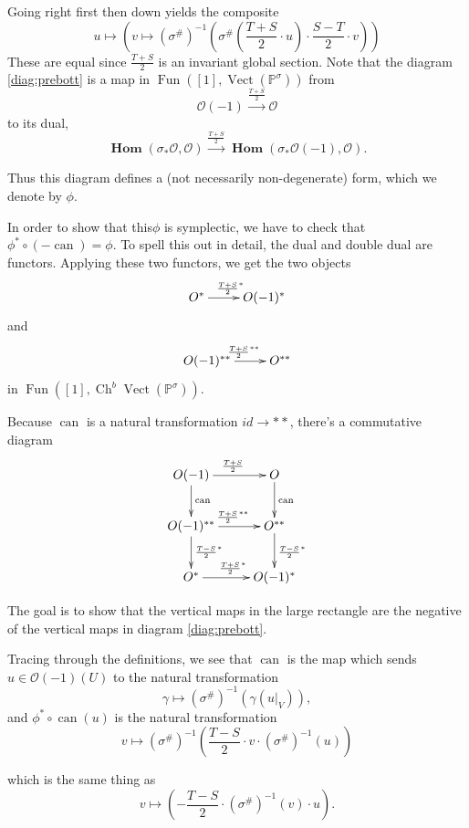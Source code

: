 \documentclass[draftthesis,tocnosub,noragright,centerchapter,10pt]{uiucthesis2009}
\newcommand{\mbb}{\mathbb}
\newcommand{\mc}{\mathcal}
\DeclareMathOperator{\can}{can}
\DeclareMathOperator{\iHom}{\mathbf{Hom}}
\DeclareMathOperator{\Ch}{Ch}
\DeclareMathOperator{\Fun}{Fun}
\DeclareMathOperator{\Vect}{Vect}
\theoremstyle{plain}
\theoremstyle{definition}
\begin{document}
Going right first then down yields the composite
\[
u \mapsto (v \mapsto (\sigma^\#)^{-1}(\sigma^\#(\frac{T+S}{2} \cdot u
)\cdot \frac{S-T}{2}\cdot v))
\]
These are equal since $\frac{T+S}{2}$ is an invariant global
section. Note that the diagram \ref{diag:prebott} is a map in
$\Fun([1],\Vect(\mbb P^\sigma))$ from 
\[
\mc O(-1) \xrightarrow{\frac{T+S}{2}} \mc O
\]
to its dual,
\[
\iHom(\sigma_*\mc
  O,\mc O) \xrightarrow{\frac{T+S}{2}}  \iHom(\sigma_* \mc O(-1),\mc O).
\]

Thus this diagram defines a (not necessarily non-degenerate) form,
which we denote by $\phi$. 

In order to show that this$\phi$ is symplectic, we have to check that
$\phi^* \circ (-\can) = \phi$. To spell this out in detail, the dual
and double dual are functors. Applying these two functors, we get the
two objects
\[
\xymatrix{O^* \ar[r]^{\frac{T+S}{2}^\ast} & O(-1)^*}
\]
and
\[
\xymatrix{O(-1)^{\ast\ast} \ar[r]^{\frac{T+S}{2}^{\ast\ast}} & O^{\ast\ast}}
\]
in  $\Fun([1],\Ch^b\Vect(\mbb P^\sigma))$.

Because $\can$ is a natural transformation $id \rightarrow \ast\ast$,
there's a commutative diagram
\[
\xymatrix{O(-1) \ar[d]^{\can} \ar[r]^{\frac{T+S}{2}} & O \ar[d]^{\can}
  \\ O(-1)^{\ast\ast} \ar[r]^{\frac{T+S}{2}^{\ast\ast}}
  \ar[d]^{\frac{T-S}{2}^\ast} & \ar[d]^{\frac{T-S}{2}^\ast}  O^{\ast\ast}
\\O^{\ast} \ar[r]^{\frac{T+S}{2}^{\ast}} & O(-1)^{\ast}
}
\]

The goal is to show that the vertical maps in the large rectangle are
the negative of the vertical maps in diagram \ref{diag:prebott}.

Tracing
through the definitions, we see that $\can$ is the map which sends $u
\in \mc O(-1)(U)$ to the natural transformation
\[
\gamma \mapsto (\sigma^\#)^{-1}(\gamma(u|_V)),
\]
and $\phi^* \circ \can (u)$ is the natural transformation
\[
v \mapsto (\sigma^\#)^{-1}\left(\frac{T-S}{2} \cdot v \cdot (\sigma^\#)^{-1}(u)\right)
\]

which is the same thing as
\[
v \mapsto \left(-\frac{T-S}{2} \cdot (\sigma^\#)^{-1} (v) \cdot u\right).
\]

\end{document}
